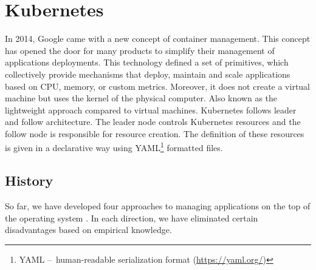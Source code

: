 \section{Kubernetes}
\label{01:sec:title}

In 2014, Google came with a new concept of container management.
This concept has opened the door for many products to simplify their management of applications deployments.
This technology defined a set of primitives, which collectively provide mechanisms that deploy, maintain and scale applications based on CPU, memory, or custom metrics.
Moreover, it does not create a virtual machine but uses the kernel of the physical computer.
Also known as the lightweight approach compared to virtual machines.
Kubernetes follows leader and follow architecture.
The leader node controls Kubernetes resources and the follow node is responsible for resource creation.
The definition of these resources is given in a declarative way using YAML\footnote{YAML
\---\ human-readable serialization format (\url{https://yaml.org/})} formatted files.

\subsection{History}
\label{fig:history}

So far, we have developed four approaches to managing applications on the top of the operating system \cite{history}.
In each direction, we have eliminated certain disadvantages based on empirical knowledge.

